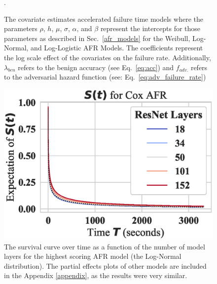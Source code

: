 \begin{figure}
\begin{subfigure}{0.32\textwidth}
	\end{subfigure}

	\caption{The covariate estimates accelerated failure time models where the parameters $\rho$, $h$, $\mu$, $\sigma$, $\alpha$, and $\beta$ represent the intercepts for those parameters as described in Sec.~\ref{afr_models} for the Weibull, Log-Normal, and Log-Logistic AFR Models. The coefficients represent the log scale effect of the covariates on the failure rate. Additionally, $\lambda_{ben}$ refers to the benign accuracy (see Eq.~\ref{eq:acc}) and $f_{adv.}$ refers to the adversarial hazard function (see: Eq.~\ref{eq:adv_failure_rate})}.
	\label{fig:afr_models}
\end{figure}

% 
\begin{figure}
	\centering\includegraphics[width=.5\textwidth]{cifar100/log_normal_layers_partial_effect.eps}
	\caption{The survival curve over time as a function of the number of model layers for the highest scoring AFR model (the Log-Normal distribution). The partial effects plots of other models are included in the Appendix \ref{appendix}, as the results were very similar.}
	\label{fig:layers}
\end{figure}
% 


